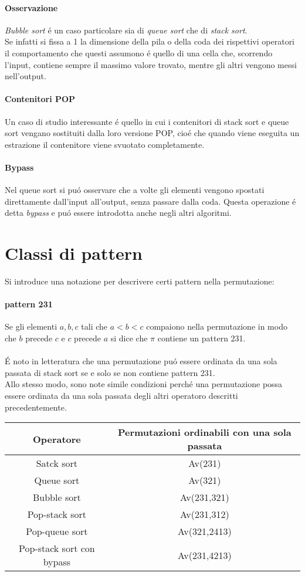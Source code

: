 \paragraph*{Osservazione}\textit{Bubble sort} \'e un caso particolare sia di \textit{queue sort} che di \textit{stack sort}.\\
Se infatti si fissa a 1 la dimensione della pila o della coda dei rispettivi operatori il comportamento che questi assumono \'e quello di una cella che, scorrendo l'input, contiene sempre il massimo valore trovato, mentre gli altri vengono messi nell'output.
\paragraph*{Contenitori POP}Un caso di studio interessante \'e quello in cui i contenitori di stack sort e queue sort vengano sostituiti dalla loro versione POP, cio\'e che quando viene eseguita un estrazione il contenitore viene svuotato completamente. 
\paragraph*{Bypass}Nel queue sort si pu\'o osservare che a volte gli elementi vengono spostati direttamente dall'input all'output, senza passare dalla coda. Questa operazione \'e detta \textit{bypass} e pu\'o essere introdotta anche negli altri algoritmi.
\section*{Classi di pattern}
Si introduce una notazione per descrivere certi pattern nella permutazione:
\paragraph*{pattern 231}Se gli elementi ${a,b,c}$ tali che $a<b<c$ compaiono nella permutazione in modo che $b$ precede $c$ e $c$ precede $a$ si dice che $\pi$ contiene un pattern 231.\\\\


\'E noto in letteratura che una permutazione pu\'o essere ordinata da una sola passata di stack sort se e solo se non contiene pattern 231.\\
Allo stesso modo, sono note simile condizioni perch\'e una permutazione possa essere ordinata da una sola passata degli altri operatoro descritti precedentemente.
\begin{center}
\begin{tabular}{ |c|c| } 
\hline
\textbf{Operatore} & \textbf{Permutazioni ordinabili con una sola passata} \\ 
\hline
Satck sort & Av(231)\\ 
Queue sort & Av(321)\\ 
Bubble sort & Av(231,321)\\ 
Pop-stack sort & Av(231,312)\\ 
Pop-queue sort& Av(321,2413)\\ 
Pop-stack sort con bypass &Av(231,4213)\\ 
\hline
\end{tabular}
\end{center}
